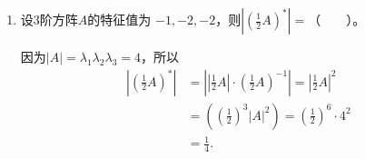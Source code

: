 \begin{enumerate}[1~]
\begin{enumerate}[1.~]
\item
设3阶方阵$A$的特征值为 $-1, -2, -2$，则$|(\frac12 A)^{*}| = $（\ \ \ \ ）。
\begin{solution}
因为$|A| = \lambda_1 \lambda_2 \lambda_3 = 4$，所以\begin{align*}
\left|\left(\frac12 A \right)^*\right| &= \left|\left|\frac12 A\right| \cdot \left(\frac12 A\right)^{-1}\right| = \left|\frac12 A\right|^2 \\
&= \left(\left(\frac12\right)^3 |A|^2\right) = \left(\frac12\right)^6 \cdot 4^2 \\
&=\frac14.
\end{align*}
\end{solution} 

\end{enumerate}

\end{enumerate}
\endinput